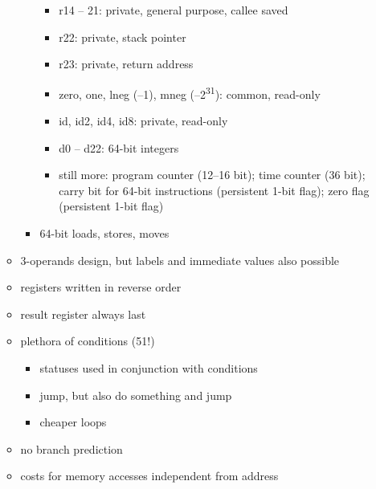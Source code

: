 \begin{itemize}
\begin{itemize}
\begin{itemize}
\begin{itemize}
				\item
				r14 -- 21:
				private,
				general purpose,
				callee saved

				\item
				r22:
				private,
				stack pointer

				\item
				r23:
				private,
				return address

				\item
				zero, one, lneg (--1), mneg (--2\textsuperscript{31}):
				common,
				read-only

				\item
				id, id2, id4, id8:
				private,
				read-only

				\item
				d0 -- d22:
				64-bit integers

				\item
				still more:
				program counter (12--16 bit);
				time counter (36 bit);
				carry bit for 64-bit instructions (persistent 1-bit flag);
				zero flag (persistent 1-bit flag)
			\end{itemize}

			\item
			64-bit loads, stores, moves
		\end{itemize}

		\item
		3-operands design, but labels and immediate values also possible

		\item
		registers written in reverse order

		\item
		result register always last

		\item
		plethora of conditions (51!)
		\begin{itemize}
			\item
			statuses used in conjunction with conditions

			\item
			jump, but also do something and jump

			\item
			cheaper loops
		\end{itemize}

		\item
		no branch prediction

		\item
		costs for memory accesses independent from address
	\end{itemize}


\end{itemize}
